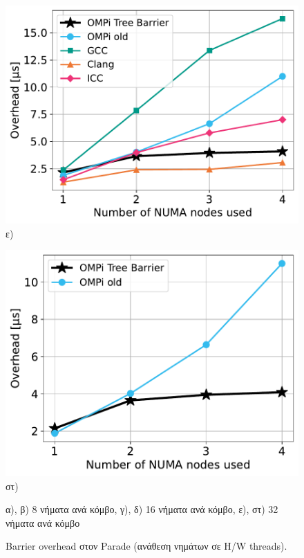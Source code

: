 \begin{figure}[htbp]
\begin{minipage}{0.5\textwidth}
        \includegraphics[width=1\textwidth]{Figures/parade-epcc/topothreads_tpn-32_close.pdf}
        ε)
    \end{minipage}\hfill
    \begin{minipage}{0.5\textwidth}
        \centering
        \includegraphics[width=1\textwidth]{Figures/parade-epcc/ompionly_topothreads_tpn-32_close.pdf}
        στ)
    \end{minipage}
    \newline \newline
    {\small α), β) 8 νήματα ανά κόμβο, γ), δ) 16 νήματα ανά κόμβο, ε), στ) 32 νήματα ανά κόμβο}
    \caption{Barrier overhead στον Parade (ανάθεση νημάτων σε H/W threads).}
    \label{fig:bo-parade-topothreads}
\end{figure}

